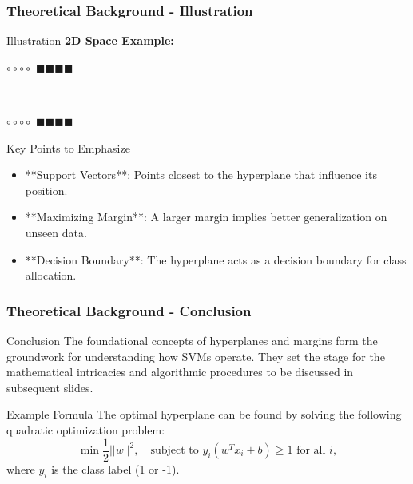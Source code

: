 \documentclass{beamer}
\begin{document}
\begin{frame}[fragile]
    \frametitle{Theoretical Background - Illustration}
    \begin{block}{Illustration}
        \textbf{2D Space Example:}
        \begin{center}
             $\circ \circ \circ \circ$ \hspace{0.5cm} 
             $\blacksquare\blacksquare\blacksquare\blacksquare$
        \end{center}
        \begin{center}
            \text{--------------------------} \\
        \end{center}
        \begin{center}
             $\circ \circ \circ \circ$ \hspace{0.5cm} 
             $\blacksquare\blacksquare\blacksquare\blacksquare$
        \end{center}
    \end{block}
    \begin{block}{Key Points to Emphasize}
        \begin{itemize}
            \item **Support Vectors**: Points closest to the hyperplane that influence its position.
            \item **Maximizing Margin**: A larger margin implies better generalization on unseen data.
            \item **Decision Boundary**: The hyperplane acts as a decision boundary for class allocation.
        \end{itemize}
    \end{block}
\end{frame}

\begin{frame}[fragile]
    \frametitle{Theoretical Background - Conclusion}
    \begin{block}{Conclusion}
        The foundational concepts of hyperplanes and margins form the groundwork for understanding how SVMs operate. 
        They set the stage for the mathematical intricacies and algorithmic procedures to be discussed in subsequent slides.
    \end{block}
    \begin{block}{Example Formula}
        The optimal hyperplane can be found by solving the following quadratic optimization problem:
        \begin{equation}
            \min \frac{1}{2} ||w||^2, \quad \text{subject to } y_i(w^T x_i + b) \geq 1 \text{ for all } i,
        \end{equation}
        where \( y_i \) is the class label (1 or -1).
    \end{block}
\end{frame}
\end{document}
